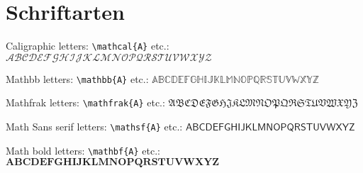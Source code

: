\documentclass[11pt, a4paper]{article}
\begin{document}
	\section{Schriftarten}
	
	Caligraphic letters: \verb*|\mathcal{A}| etc.: $\mathcal{ABCDEFGHIJKLMNOPQRSTUVWXYZ}$
	
	\smallskip\noindent
	Mathbb letters: \verb*|\mathbb{A}| etc.: $\mathbb{ABCDEFGHIJKLMNOPQRSTUVWXYZ}$
	
	\smallskip\noindent
	Mathfrak letters: \verb*|\mathfrak{A}| etc.: $\mathfrak{A B C D E F G H J KLMNOPQRSTUVWXYZ}$
	
	\smallskip\noindent
	Math Sans serif letters: \verb*|\mathsf{A}| etc.: $\mathsf{ABCDEFGHIJKLMNOPQRSTUVWXYZ}$
	
	\smallskip\noindent
	Math bold letters: \verb*|\mathbf{A}| etc.: $\mathbf{ABCDEFGHIJKLMNOPQRSTUVWXYZ}$
	
\end{document}
